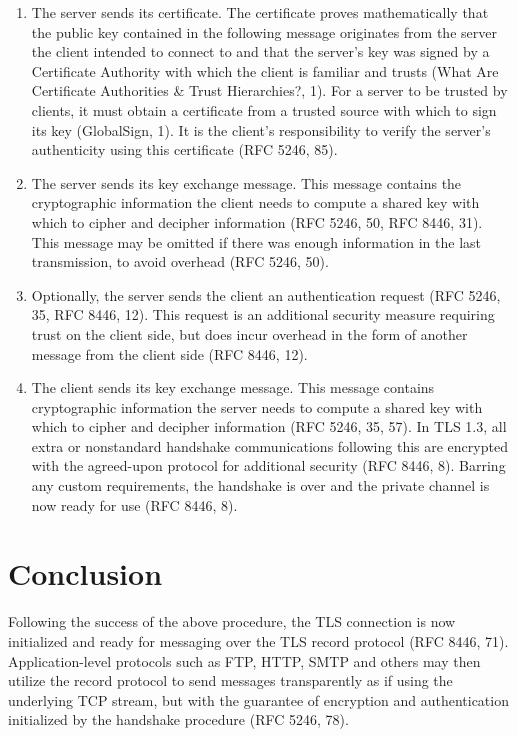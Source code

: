 \documentclass[12pt]{article}
\begin{document}
\begin{enumerate}
    \item The server sends its certificate. The certificate proves mathematically that the public key contained in the following message originates from the server the client intended to connect to and that the server’s key was signed by a Certificate Authority with which the client is familiar and trusts (What Are Certificate Authorities \& Trust Hierarchies?, 1). For a server to be trusted by clients, it must obtain a certificate from a trusted source with which to sign its key (GlobalSign, 1). It is the client’s responsibility to verify the server’s authenticity using this certificate (RFC 5246, 85).
    \item The server sends its key exchange message. This message contains the cryptographic information the client needs to compute a shared key with which to cipher and decipher information (RFC 5246, 50, RFC 8446, 31). This message may be omitted if there was enough information in the last transmission, to avoid overhead (RFC 5246, 50).
    \item Optionally, the server sends the client an authentication request (RFC 5246, 35, RFC 8446, 12). This request is an additional security measure requiring trust on the client side, but does incur overhead in the form of another message from the client side (RFC 8446, 12).
    \item The client sends its key exchange message. This message contains cryptographic information the server needs to compute a shared key with which to cipher and decipher information (RFC 5246, 35, 57). In TLS 1.3, all extra or nonstandard handshake communications following this are encrypted with the agreed-upon protocol for additional security (RFC 8446, 8). Barring any custom requirements, the handshake is over and the private channel is now ready for use (RFC 8446, 8).
\end{enumerate}

\section{Conclusion}
Following the success of the above procedure, the TLS connection is now initialized and ready for messaging over the TLS record protocol (RFC 8446, 71). Application-level protocols such as FTP, HTTP, SMTP and others may then utilize the record protocol to send messages transparently as if using the underlying TCP stream, but with the guarantee of encryption and authentication initialized by the handshake procedure (RFC 5246, 78).
\end{document}

